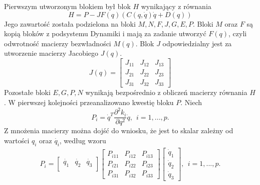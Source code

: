 \documentclass[eng,printmode]{mgr}
\begin{document}
Pierwszym utworzonym blokiem był blok $H$ wynikający z równania 
\begin{equation}
H=P -JF(q)(C(q, \dot{q})\dot{q} + D(q))
\end{equation} 
Jego zawartość została podzielona na bloki $M, N, F, J, G, E, P$.
Bloki $M$ oraz $F$ są kopią bloków z podsystemu Dynamiki i mają za zadanie utworzyć $F(q)$, czyli odwrotność macierzy bezwładności $M(q)$. Blok $J$ odpowiedzialny jest za utworzenie macierzy Jacobiego $J(q)$. 
$$
J(q)=\left[
      \begin{array}{ccc}
         J_{11} & J_{12} & J_{13}\\ 
         J_{21} &J_{22} & J_{23}\\
         J_{31} & J_{32} & J_{33}
         \end{array}
      \right]
      $$
Pozostałe bloki $E, G, P, N$ wynikają bezpośrednio z obliczeń macierzy równania $H$. W pierwszej kolejności przeanalizowano kwestię bloku $P$. Niech
\begin{equation}
P_i=\dot{q}^T\frac{∂^2k_i}{∂q^2}\dot{q}, \ \ i=1,...,p.
\end{equation}
Z mnożenia macierzy można dojść do wniosku, że jest to skalar zależny od wartości $q_i$ oraz $\dot{q_i}$, według wzoru
\begin{eqnarray}
P_i=\left[
      \begin{array}{ccc}
         \dot{q_{1}} &\dot{q_{2}} & \dot{q_{3}}\\ 
         \end{array}
      \right]\left[
      \begin{array}{ccc}
         P_{i11} &P_{i12} & P_{i13}\\ 
         P_{i21} &P_{i22} & P_{i23}\\ 
         P_{i31} &P_{i32} & P_{i33}
         \end{array}
      \right]\left[
      \begin{array}{c}
         \dot{q}_1 \\
         \dot{q}_2 \\
         \dot{q}_3
         \end{array}
      \right], \ \ i=1,...,p.
\end{eqnarray}
\end{document}
